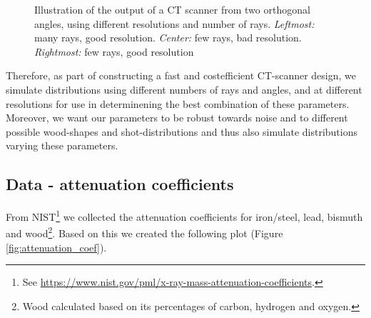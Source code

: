 \documentclass{article}
\begin{document}
\begin{figure}[htbp]
    \captionsetup{justification=centering}
    \caption[]{\small Illustration of the output of a CT scanner from two orthogonal angles, using different resolutions and number of rays. \emph{Leftmost:} many rays, good resolution. \emph{Center:} few rays, bad resolution. \emph{Rightmost:} few rays, good resolution}
    \label{fig:tikz-pictures}
\end{figure} 
Therefore, as part of constructing a fast and costefficient CT-scanner design, we simulate distributions using different numbers of rays and angles, and at different resolutions for use in determinening the best combination of these parameters. Moreover, we want our parameters to be robust towards noise and to different possible wood-shapes and shot-distributions and thus also simulate distributions varying these parameters.

\subsection{Data - attenuation coefficients}
From NIST\footnote{See \url{https://www.nist.gov/pml/x-ray-mass-attenuation-coefficients}.} we collected the attenuation coefficients for iron/steel, lead, bismuth and wood\footnote{Wood calculated based on its percentages of carbon, hydrogen and oxygen.}. Based on this we created the following plot (Figure \ref{fig:attenuation_coef}).
\end{document}
